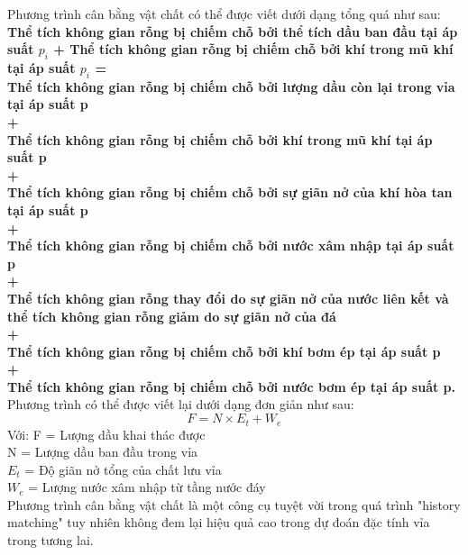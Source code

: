\documentclass[12pt,a4paper]{report}
\begin{document}
    \newline
    Phương trình cân bằng vật chất có thể được viết dưới dạng tổng quá như sau:\\
    \textbf{Thể tích không gian rỗng bị chiếm chỗ bởi thể tích dầu ban đầu tại áp suất $p_i$ + Thể tích không gian rỗng bị chiếm chỗ bởi khí trong mũ khí tại áp suất $p_i$ =\\
    \hspace*{1cm}Thể tích không gian rỗng bị chiếm chỗ bởi lượng dầu còn lại trong vỉa tại áp suất p\\\hspace*{1cm} + \\
    \hspace*{1cm}Thể tích không gian rỗng bị chiếm chỗ bởi khí trong mũ khí tại áp suất p\\\hspace*{1cm} + \\
    \hspace*{1cm}Thể tích không gian rỗng bị chiếm chỗ bởi sự giãn nở của khí hòa tan tại áp suất p\\\hspace*{1cm} +\\
    \hspace*{1cm}Thể tích không gian rỗng bị chiếm chỗ bởi nước xâm nhập tại áp suất p\\\hspace*{1cm} + \\
    \hspace*{1cm}Thể tích không gian rỗng thay đổi do sự giãn nở của nước liên kết và thể tích không gian rỗng giảm do sự giãn nở của đá\\\hspace*{1cm} + \\
    \hspace*{1cm}Thể tích không gian rỗng bị chiếm chỗ bởi khí bơm ép tại áp suất p\\\hspace*{1cm} +\\
    \hspace*{1cm}Thể tích không gian rỗng bị chiếm chỗ bởi nước bơm ép tại áp suất p.\\}
    Phương trình có thể được viết lại dưới dạng đơn giản như sau:
    \begin{equation}
    	F = N\times{E}_t+W_e
    \end{equation}
    Với: F = Lượng dầu khai thác được\\
    \hspace*{1cm}N = Lượng dầu ban đầu trong vỉa\\
    \hspace*{1cm}$E_t$ = Độ giãn nở tổng của chất lưu vỉa\\
    \hspace*{1cm}$W_e$ = Lượng nước xâm nhập từ tầng nước đáy\\
Phương trình cân bằng vật chất là một công cụ tuyệt vời trong quá trình "history matching" tuy nhiên không đem lại hiệu quả cao trong dự đoán đặc tính vỉa trong tương lai.
\end{document}
